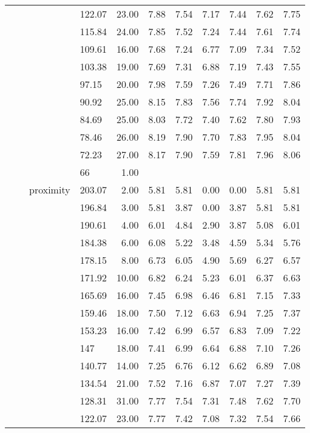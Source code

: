 \begin{longtable}{llllrrrrrrr}
   &  &  & 122.07 & 23.00 & 7.88 & 7.54 & 7.17 & 7.44 & 7.62 & 7.75 \\ 
   &  &  & 115.84 & 24.00 & 7.85 & 7.52 & 7.24 & 7.44 & 7.61 & 7.74 \\ 
   &  &  & 109.61 & 16.00 & 7.68 & 7.24 & 6.77 & 7.09 & 7.34 & 7.52 \\ 
   &  &  & 103.38 & 19.00 & 7.69 & 7.31 & 6.88 & 7.19 & 7.43 & 7.55 \\ 
   &  &  & 97.15 & 20.00 & 7.98 & 7.59 & 7.26 & 7.49 & 7.71 & 7.86 \\ 
   &  &  & 90.92 & 25.00 & 8.15 & 7.83 & 7.56 & 7.74 & 7.92 & 8.04 \\ 
   &  &  & 84.69 & 25.00 & 8.03 & 7.72 & 7.40 & 7.62 & 7.80 & 7.93 \\ 
   &  &  & 78.46 & 26.00 & 8.19 & 7.90 & 7.70 & 7.83 & 7.95 & 8.04 \\ 
   &  &  & 72.23 & 27.00 & 8.17 & 7.90 & 7.59 & 7.81 & 7.96 & 8.06 \\ 
   &  &  & 66 & 1.00 &  &  &  &  &  &  \\ 
   &  & proximity & 203.07 & 2.00 & 5.81 & 5.81 & 0.00 & 0.00 & 5.81 & 5.81 \\ 
   &  &  & 196.84 & 3.00 & 5.81 & 3.87 & 0.00 & 3.87 & 5.81 & 5.81 \\ 
   &  &  & 190.61 & 4.00 & 6.01 & 4.84 & 2.90 & 3.87 & 5.08 & 6.01 \\ 
   &  &  & 184.38 & 6.00 & 6.08 & 5.22 & 3.48 & 4.59 & 5.34 & 5.76 \\ 
   &  &  & 178.15 & 8.00 & 6.73 & 6.05 & 4.90 & 5.69 & 6.27 & 6.57 \\ 
   &  &  & 171.92 & 10.00 & 6.82 & 6.24 & 5.23 & 6.01 & 6.37 & 6.63 \\ 
   &  &  & 165.69 & 16.00 & 7.45 & 6.98 & 6.46 & 6.81 & 7.15 & 7.33 \\ 
   &  &  & 159.46 & 18.00 & 7.50 & 7.12 & 6.63 & 6.94 & 7.25 & 7.37 \\ 
   &  &  & 153.23 & 16.00 & 7.42 & 6.99 & 6.57 & 6.83 & 7.09 & 7.22 \\ 
   &  &  & 147 & 18.00 & 7.41 & 6.99 & 6.64 & 6.88 & 7.10 & 7.26 \\ 
   &  &  & 140.77 & 14.00 & 7.25 & 6.76 & 6.12 & 6.62 & 6.89 & 7.08 \\ 
   &  &  & 134.54 & 21.00 & 7.52 & 7.16 & 6.87 & 7.07 & 7.27 & 7.39 \\ 
   &  &  & 128.31 & 31.00 & 7.77 & 7.54 & 7.31 & 7.48 & 7.62 & 7.70 \\ 
   &  &  & 122.07 & 23.00 & 7.77 & 7.42 & 7.08 & 7.32 & 7.54 & 7.66 \\ 

\end{longtable}

